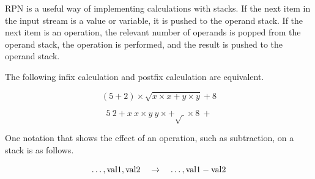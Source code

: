 RPN is a useful way of implementing calculations with stacks.
If the next item in the input stream is a value or variable, it is pushed to the operand stack.
If the next item is an operation, the relevant number of operands is popped from the operand stack, the operation is performed, and the result is pushed to the operand stack.

The following infix calculation and postfix calculation are equivalent.

\begin{equation*}
  \left( 5 + 2 \right) \times \sqrt{ x \times x + y \times y } + 8
\end{equation*}

\begin{equation*}
  5 \> 2 + x \> x \times y \> y \times + \sqrt{\>} \times 8 \> +
\end{equation*}

One notation that shows the effect of an operation, such as subtraction, on a stack is as follows.

\begin{equation*}
  \ldots, \textnormal{val1}, \textnormal{val2} \quad \rightarrow \quad \ldots, \textnormal{val1} - \textnormal{val2}
\end{equation*}

